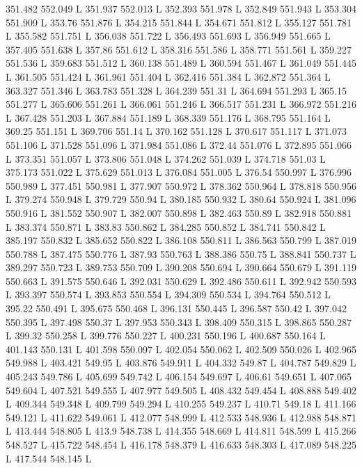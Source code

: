 351.482 552.049 L
351.937 552.013 L
352.393 551.978 L
352.849 551.943 L
353.304 551.909 L
353.76 551.876 L
354.215 551.844 L
354.671 551.812 L
355.127 551.781 L
355.582 551.751 L
356.038 551.722 L
356.493 551.693 L
356.949 551.665 L
357.405 551.638 L
357.86 551.612 L
358.316 551.586 L
358.771 551.561 L
359.227 551.536 L
359.683 551.512 L
360.138 551.489 L
360.594 551.467 L
361.049 551.445 L
361.505 551.424 L
361.961 551.404 L
362.416 551.384 L
362.872 551.364 L
363.327 551.346 L
363.783 551.328 L
364.239 551.31 L
364.694 551.293 L
365.15 551.277 L
365.606 551.261 L
366.061 551.246 L
366.517 551.231 L
366.972 551.216 L
367.428 551.203 L
367.884 551.189 L
368.339 551.176 L
368.795 551.164 L
369.25 551.151 L
369.706 551.14 L
370.162 551.128 L
370.617 551.117 L
371.073 551.106 L
371.528 551.096 L
371.984 551.086 L
372.44 551.076 L
372.895 551.066 L
373.351 551.057 L
373.806 551.048 L
374.262 551.039 L
374.718 551.03 L
375.173 551.022 L
375.629 551.013 L
376.084 551.005 L
376.54 550.997 L
376.996 550.989 L
377.451 550.981 L
377.907 550.972 L
378.362 550.964 L
378.818 550.956 L
379.274 550.948 L
379.729 550.94 L
380.185 550.932 L
380.64 550.924 L
381.096 550.916 L
381.552 550.907 L
382.007 550.898 L
382.463 550.89 L
382.918 550.881 L
383.374 550.871 L
383.83 550.862 L
384.285 550.852 L
384.741 550.842 L
385.197 550.832 L
385.652 550.822 L
386.108 550.811 L
386.563 550.799 L
387.019 550.788 L
387.475 550.776 L
387.93 550.763 L
388.386 550.75 L
388.841 550.737 L
389.297 550.723 L
389.753 550.709 L
390.208 550.694 L
390.664 550.679 L
391.119 550.663 L
391.575 550.646 L
392.031 550.629 L
392.486 550.611 L
392.942 550.593 L
393.397 550.574 L
393.853 550.554 L
394.309 550.534 L
394.764 550.512 L
395.22 550.491 L
395.675 550.468 L
396.131 550.445 L
396.587 550.42 L
397.042 550.395 L
397.498 550.37 L
397.953 550.343 L
398.409 550.315 L
398.865 550.287 L
399.32 550.258 L
399.776 550.227 L
400.231 550.196 L
400.687 550.164 L
401.143 550.131 L
401.598 550.097 L
402.054 550.062 L
402.509 550.026 L
402.965 549.988 L
403.421 549.95 L
403.876 549.911 L
404.332 549.87 L
404.787 549.829 L
405.243 549.786 L
405.699 549.742 L
406.154 549.697 L
406.61 549.651 L
407.065 549.604 L
407.521 549.555 L
407.977 549.505 L
408.432 549.454 L
408.888 549.402 L
409.344 549.348 L
409.799 549.294 L
410.255 549.237 L
410.71 549.18 L
411.166 549.121 L
411.622 549.061 L
412.077 548.999 L
412.533 548.936 L
412.988 548.871 L
413.444 548.805 L
413.9 548.738 L
414.355 548.669 L
414.811 548.599 L
415.266 548.527 L
415.722 548.454 L
416.178 548.379 L
416.633 548.303 L
417.089 548.225 L
417.544 548.145 L
